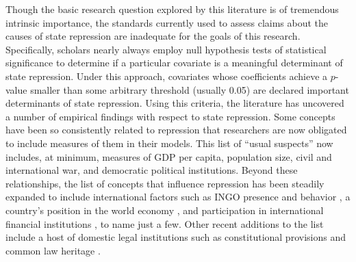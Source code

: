 \documentclass[12pt]{article}
\begin{document}
Though the basic research question explored by this literature is of tremendous intrinsic importance, the standards currently used to assess claims about the causes of state repression are inadequate for the goals of this research. Specifically, scholars nearly always employ null hypothesis tests of statistical significance to determine if a particular covariate is a meaningful determinant of state repression. Under this approach, covariates whose coefficients achieve a $p$-value smaller than some arbitrary threshold (usually 0.05) are declared important determinants of state repression. Using this criteria, the literature has uncovered a number of empirical findings with respect to state repression. Some concepts have been so consistently related to repression that researchers are now obligated to include measures of them in their models. This list of ``usual suspects'' now includes, at minimum, measures of GDP per capita, population size, civil and international war, and democratic political institutions. Beyond these relationships, the list of concepts that influence repression has been steadily expanded to include international factors such as INGO presence and behavior \citep{HafnerBurtonTsutsui2005, Franklin2008, MurdieDavis2012}, a country's position in the world economy \citep{HafnerBurton2005jpr}, and participation in international financial institutions \citep{AbouharbCingranelli2006, AbouharbCingranelli2007}, to name just a few. Other recent additions to the list include a host of domestic legal institutions such as constitutional provisions \citep{Cross1999, KeithTatePoe2009} and common law heritage \citep{Mitchell2013}. 
\end{document}
